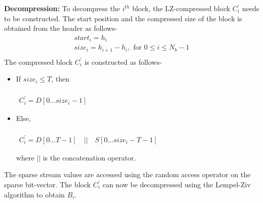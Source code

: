 \textbf{Decompression:} To decompress the $i^{th}$ block, the LZ-compressed block $C_{i}^{'}$ needs to be constructed. The start position and the compressed size of the block is obtained from the header as follows-
$$
\begin{gathered}
    start_i = h_i \\
    size_i = h_{i+1} - h_i,  \text{ for } 0 \leq i \leq N_b - 1 \\
\end{gathered}
$$
The compressed block $C_{i}^{'}$ is constructed as follows-
\begin{itemize}
    \item If $size_i \leq T $, then \\~\\
         \smallskip \hspace{5ex}$
        \begin{gathered}
            C_i ^ {'} = D[0 \ldots size_i - 1]
        \end{gathered}
        $ 
    \item Else,\\~\\
         \smallskip \hspace{5ex}$
        \begin{gathered}
            C_i ^ {'} = D[0 \ldots T - 1] \quad || \quad S[0 \ldots size_i - T - 1]
        \end{gathered}
        $
        
        where $||$ is the concatenation operator.
\end{itemize}
The sparse stream values are accessed using the random access operator on the sparse bit-vector.
The block $C_i ^ {'}$ can now be decompressed using the Lempel-Ziv algorithm to obtain $B_i$.